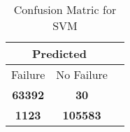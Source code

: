 \begin{table}[] 
\caption{Confusion Matric for SVM} 
\label{Table: Prediction Accuracy-DMDSVM100.0EKF-ignoresolarPanelDipole-solarPanelDipole} 
\centering 
\begin{tabular} 
 {@{}ccc@{}} 
\toprule 
\multicolumn{2}{c}{\textbf{Predicted}}
 \\ \midrule 
\multicolumn{1}{|c|}{Failure} & 
\multicolumn{1}{c|}{No Failure}
 \\ \midrule 
\multicolumn{1}{|c|}{\color{green}\textbf{63392}} & 
\multicolumn{1}{c|}{\color{red}\textbf{30}}
 \\ \midrule 
\multicolumn{1}{|c|}{\color{red}\textbf{1123}} & 
\multicolumn{1}{c|}{\color{green}\textbf{105583}}
 \\ \bottomrule 
\end{tabular} 
\end{table} 
